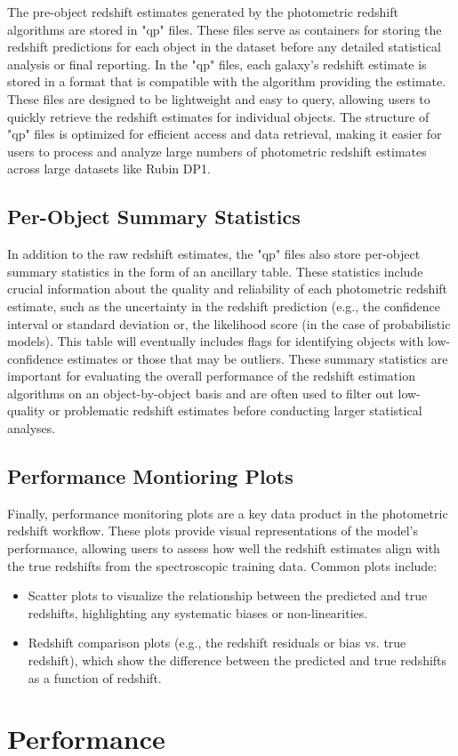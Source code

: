 The pre-object redshift estimates generated by the photometric redshift algorithms are stored in "qp" files.  These files serve as containers for storing the redshift predictions for each object in the dataset before any detailed statistical analysis or final reporting. In the "qp" files, each galaxy’s redshift estimate is stored in a format that is compatible with the algorithm providing the estimate.  These files are designed to be lightweight and easy to query, allowing users to quickly retrieve the redshift estimates for individual objects. The structure of "qp" files is optimized for efficient access and data retrieval, making it easier for users to process and analyze large numbers of photometric redshift estimates across large datasets like Rubin DP1.


\subsection{Per-Object Summary Statistics}
\label{sec: products:summary_statistics}

In addition to the raw redshift estimates, the "qp" files also store per-object summary statistics in the form of an ancillary table. These statistics include crucial information about the quality and reliability of each photometric redshift estimate, such as the uncertainty in the redshift prediction (e.g., the confidence interval or standard deviation or, the likelihood score (in the case of probabilistic models).   This table will eventually includes flags for identifying objects with low-confidence estimates or those that may be outliers. These summary statistics are important for evaluating the overall performance of the redshift estimation algorithms on an object-by-object basis and are often used to filter out low-quality or problematic redshift estimates before conducting larger statistical analyses.

\subsection{Performance Montioring Plots}
\label{sec: products:peformance_plots}

Finally, performance monitoring plots are a key data product in the photometric redshift workflow. These plots provide visual representations of the model's performance, allowing users to assess how well the redshift estimates align with the true redshifts from the spectroscopic training data. Common plots include:

\begin{itemize}
\item{Scatter plots to visualize the relationship between the predicted and true redshifts, highlighting any systematic biases or non-linearities.}
\item{Redshift comparison plots (e.g., the redshift residuals or bias vs. true redshift), which show the difference between the predicted and true redshifts as a function of redshift.}
\end{itemize}



\section{Performance}
\label{sec:performance:0}
